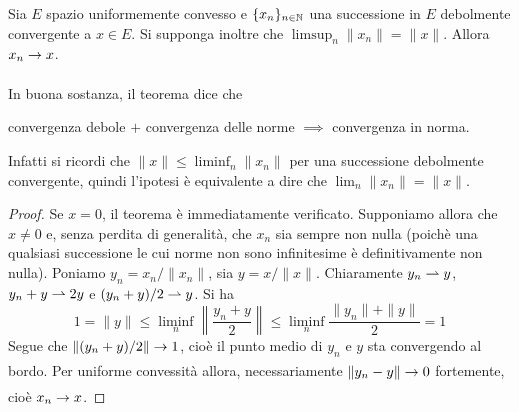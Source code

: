 \begin{theorem}
\label{th:weaktop_seventeen}
	Sia $E$ spazio uniformemente convesso e $\{x_n\}_{n \in \mathbb{N}}$ una successione in $E$ debolmente convergente a $x \in E$. Si supponga inoltre che $\limsup_n \|x_n\| = \|x\|$.
	Allora $x_n \underset{{}}{\rightarrow} x$.
\end{theorem}
\begin{remark}
	In buona sostanza, il teorema dice che
	\begin{center}
		convergenza debole $+$ convergenza delle norme $\implies$ convergenza in norma.
	\end{center}
	Infatti si ricordi che $\|x\| \leq \liminf_n \|x_n\|$ per una successione debolmente convergente, quindi l'ipotesi è equivalente a dire che $\lim_n \|x_n\| = \|x\|$.
\end{remark}
\begin{proof}
	Se $x=0$, il teorema è immediatamente verificato.
	Supponiamo allora che $x \neq 0$ e, senza perdita di generalità, che $x_n$ sia sempre non nulla (poichè una qualsiasi successione le cui norme non sono infinitesime è definitivamente non nulla). Poniamo $y_n = x_n/\|x_n\|$, sia $y = x/\|x\|$. Chiaramente $y_n \rightharpoonup y$, $y_n + y \rightharpoonup 2y$ e $(y_n+y)/2 \rightharpoonup y$. Si ha
	\begin{equation*}
		1 = \|y\| \leq \liminf_n \left\|\frac{y_n+y}2\right\|
			\leq \liminf_n \frac{\|y_n\|+\|y\|}2
			= 1
	\end{equation*}
	Segue che $\|(y_n+y)/2\| \underset{{}}{\rightarrow} 1$, cioè il punto medio di $y_n$ e $y$ sta convergendo al bordo. Per uniforme convessità allora, necessariamente $\|y_n - y\| \underset{{}}{\rightarrow} 0$ fortemente, cioè $x_n \underset{{}}{\rightarrow} x$.
\end{proof}
